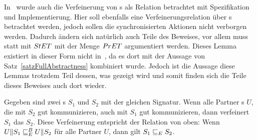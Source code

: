 In~\cite{Vogler2014EIO} wurde auch die Verfeinerung von \EIO{}s als Relation betrachtet
mit Spezifikation und Implementierung. Hier soll ebenfalls eine
Verfeinerungsrelation über \EIO{}s betrachtet werden, jedoch sollen die
synchronisierten Aktionen nicht verborgen werden. Dadurch ändern sich natürlich
auch Teile des Beweises, vor allem muss statt mit $StET{}$ mit der Menge
$PrET{}$ argumentiert werden. Dieses Lemma existiert in dieser Form nicht
in~\cite{Schlosser2012BA}, da es dort mit der Aussage von
Satz~\ref{satzFullAbstractness} kombiniert wurde. Jedoch ist die Aussage diese
Lemmas trotzdem Teil dessen, was gezeigt wird und somit finden sich die Teile
dieses Beweises auch dort wieder.

\begin{lem}
  \label{lemVerfeinerung}
  Gegeben sind zwei \EIO{}s $S_1$ und $S_2$ mit der gleichen Signatur. Wenn
  alle Partner \EIO{}s $U$, die mit $S_2$ gut kommunizieren, auch mit $S_1$ gut
  kommunizieren, dann verfeinert $S_1$ das \EIO{} $S_2$. Diese Verfeinerung
  entspricht der Relation \ERel{} von oben: Wenn $U\|S_1 \sqsubseteq _E^B U\|S_2$ für
  alle Partner $U$, dann gilt $S_1\sqsubseteq _E S_2$.
\end{lem}

